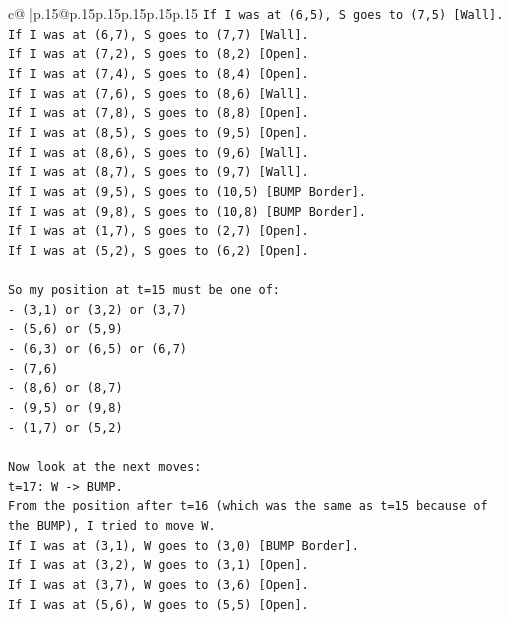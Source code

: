 \documentclass{article}
\begin{document}
{\begin{supertabular}{c@{$\;$}|p{.15\linewidth}@{}p{.15\linewidth}p{.15\linewidth}p{.15\linewidth}p{.15\linewidth}p{.15\linewidth}}
{{{\texttt{If I was at (6,5), S goes to (7,5) {[}Wall{]}.} \\
\texttt{If I was at (6,7), S goes to (7,7) {[}Wall{]}.} \\
\texttt{If I was at (7,2), S goes to (8,2) {[}Open{]}.} \\
\texttt{If I was at (7,4), S goes to (8,4) {[}Open{]}.} \\
\texttt{If I was at (7,6), S goes to (8,6) {[}Wall{]}.} \\
\texttt{If I was at (7,8), S goes to (8,8) {[}Open{]}.} \\
\texttt{If I was at (8,5), S goes to (9,5) {[}Open{]}.} \\
\texttt{If I was at (8,6), S goes to (9,6) {[}Wall{]}.} \\
\texttt{If I was at (8,7), S goes to (9,7) {[}Wall{]}.} \\
\texttt{If I was at (9,5), S goes to (10,5) {[}BUMP Border{]}.} \\
\texttt{If I was at (9,8), S goes to (10,8) {[}BUMP Border{]}.} \\
\texttt{If I was at (1,7), S goes to (2,7) {[}Open{]}.} \\
\texttt{If I was at (5,2), S goes to (6,2) {[}Open{]}.} \\
\\ 
\texttt{So my position at t=15 must be one of:} \\
\texttt{{-} (3,1) or (3,2) or (3,7)} \\
\texttt{{-} (5,6) or (5,9)} \\
\texttt{{-} (6,3) or (6,5) or (6,7)} \\
\texttt{{-} (7,6)} \\
\texttt{{-} (8,6) or (8,7)} \\
\texttt{{-} (9,5) or (9,8)} \\
\texttt{{-} (1,7) or (5,2)} \\
\\ 
\texttt{Now look at the next moves:} \\
\texttt{t=17: W {-}> BUMP.} \\
\texttt{From the position after t=16 (which was the same as t=15 because of the BUMP), I tried to move W.} \\
\texttt{If I was at (3,1), W goes to (3,0) {[}BUMP Border{]}.} \\
\texttt{If I was at (3,2), W goes to (3,1) {[}Open{]}.} \\
\texttt{If I was at (3,7), W goes to (3,6) {[}Open{]}.} \\
\texttt{If I was at (5,6), W goes to (5,5) {[}Open{]}.} \\
}}}
\end{supertabular}}
\end{document}
